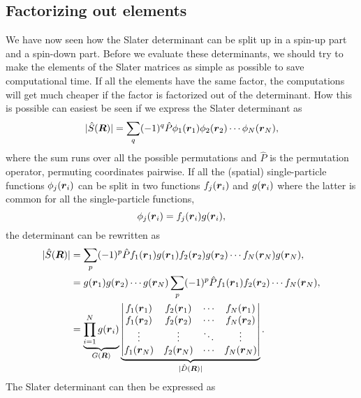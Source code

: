 \subsection{Factorizing out elements} \label{sec:factorizing}
We have now seen how the Slater determinant can be split up in a spin-up part and a spin-down part. Before we evaluate these determinants, we should try to make the elements of the Slater matrices as simple as possible to save computational time. If all the elements have the same factor, the computations will get much cheaper if the factor is factorized out of the determinant. How this is possible can easiest be seen if we express the Slater determinant as
\begin{equation}
|\hat{S}(\boldsymbol{{R}})|=\sum_{q}(-1)^q\hat{P}\phi_1(\boldsymbol{{r}}_1)\phi_2(\boldsymbol{{r}}_2)\cdots\phi_N(\boldsymbol{{r}}_N),
\label{eq:slatersum}
\end{equation}
where the sum runs over all the possible permutations and $\hat{P}$ is the permutation operator, permuting coordinates pairwise. If all the (spatial) single-particle functions $\phi_j(\boldsymbol{{r}}_i)$ can be split in two functions $f_j(\boldsymbol{{r}}_i)$ and $g(\boldsymbol{{r}}_i)$ where the latter is common for all the single-particle functions,
\begin{equation}
\phi_j(\boldsymbol{{r}}_i)=f_j(\boldsymbol{{r}}_i)g(\boldsymbol{{r}}_i),
\end{equation}
the determinant can be rewritten as
\begin{equation}
\begin{aligned}
|\hat{S}(\boldsymbol{{R}})|&=\sum_{p}(-1)^p\hat{P}f_1(\boldsymbol{{r}}_1)g(\boldsymbol{{r}}_1)f_2(\boldsymbol{{r}}_2)g(\boldsymbol{{r}}_2)\cdots f_N(\boldsymbol{{r}}_N)g(\boldsymbol{{r}}_N),\\
&=g(\boldsymbol{{r}}_1)g(\boldsymbol{{r}}_2)\cdots g(\boldsymbol{{r}}_N)\sum_{p}(-1)^p\hat{P}f_1(\boldsymbol{{r}}_1)f_2(\boldsymbol{{r}}_2)\cdots f_N(\boldsymbol{{r}}_N),\\
&=\underbrace{\prod_{i=1}^Ng(\boldsymbol{{r}}_i)}_{G(\boldsymbol{{R}})}
\underbrace{\begin{vmatrix}
f_1(\boldsymbol{r}_1) & f_2(\boldsymbol{r}_1) & \cdots & f_N(\boldsymbol{r}_1)\\
f_1(\boldsymbol{r}_2) & f_2(\boldsymbol{r}_2) & \cdots & f_N(\boldsymbol{r}_2)\\
\vdots & \vdots & \ddots & \vdots \\
f_1(\boldsymbol{r}_N) & f_2(\boldsymbol{r}_N) & \cdots & f_N(\boldsymbol{r}_N)
\end{vmatrix}}_{|\hat{D}(\boldsymbol{{R}})|}.
\end{aligned}
\end{equation}
The Slater determinant can then be expressed as
